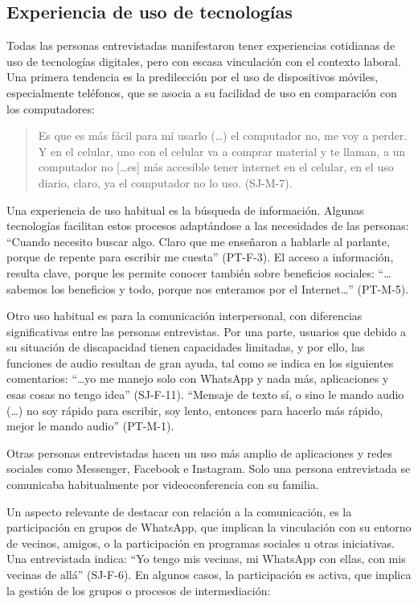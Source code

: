 \subsection{Experiencia de uso de tecnologías}\label{sub-sec-experiencedeusodetecnologías}

Todas las personas entrevistadas manifestaron tener experiencias
cotidianas de uso de tecnologías digitales, pero con escasa vinculación
con el contexto laboral. Una primera tendencia es la predilección por el
uso de dispositivos móviles, especialmente teléfonos, que se asocia a su
facilidad de uso en comparación con los computadores:

\begin{quote}
	Es que es más fácil para mí usarlo (\ldots) el computador no, me voy a
	perder. Y en el celular, uno con el celular va a comprar material y te
	llaman, a un computador no {[}\ldots es{]} más accesible tener internet en
	el celular, en el uso diario, claro, ya el computador no lo uso.
	(SJ-M-7).
\end{quote}

Una experiencia de uso habitual es la búsqueda de información. Algunas
tecnologías facilitan estos procesos adaptándose a las necesidades de
las personas: \enquote{Cuando necesito buscar algo. Claro que me enseñaron a
	hablarle al parlante, porque de repente para escribir me cuesta}
(PT-F-3). El acceso a información, resulta clave, porque les permite
conocer también sobre beneficios sociales: \enquote{\ldots sabemos los beneficios y
	todo, porque nos enteramos por el Internet\ldots} (PT-M-5).

Otro uso habitual es para la comunicación interpersonal, con diferencias
significativas entre las personas entrevistas. Por una parte, usuarios
que debido a su situación de discapacidad tienen capacidades limitadas,
y por ello, las funciones de audio resultan de gran ayuda, tal como se
indica en los siguientes comentarios: \enquote{\ldots yo me manejo solo con
	WhatsApp y nada más, aplicaciones y esas cosas no tengo idea}
(SJ-F-11). \enquote{Mensaje de texto sí, o sino le mando audio (\ldots) no soy
	rápido para escribir, soy lento, entonces para hacerlo más rápido, mejor
	le mando audio} (PT-M-1).

Otras personas entrevistadas hacen un uso más amplio de aplicaciones y
redes sociales como Messenger, Facebook e Instagram. Solo una persona
entrevistada se comunicaba habitualmente por videoconferencia con su
familia.

Un aspecto relevante de destacar con relación a la comunicación, es la
participación en grupos de WhatsApp, que implican la vinculación con su
entorno de vecinos, amigos, o la participación en programas sociales u
otras iniciativas. Una entrevistada indica: \enquote{Yo tengo mis vecinas, mi
	WhatsApp con ellas, con mis vecinas de allá} (SJ-F-6). En algunos
casos, la participación es activa, que implica la gestión de los grupos
o procesos de intermediación:

